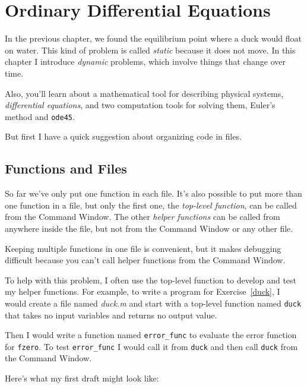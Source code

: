 \chapter{Ordinary Differential Equations}

In the previous chapter, we found the equilibrium point where a duck would float on water.  This kind of problem is called {\em static} because it does not move.  In this chapter I introduce {\em dynamic} problems, which involve things that change over time.
 
Also, you'll learn about a mathematical tool for describing physical systems, {\em differential equations}, and two computation tools for solving them, Euler's method and {\tt ode45}.

But first I have a quick suggestion about organizing code in files.

\section{Functions and Files}
\label{funfiles}

So far we've only put one function in each file.  It's also possible
to put more than one function in a file, but only the first one, the
{\em top-level function}, can be called from the Command
Window.  The other {\em helper functions} can be called from anywhere inside the file, but not from the Command Window or any other file.


Keeping multiple functions in one file is convenient, but it makes debugging
difficult because you can't call helper functions from the Command
Window.

To help with this problem, I often use the top-level function
to develop and test my helper functions.  For example, to write
a program for Exercise~\ref{duck}, I would create a file named
{\em duck.m} and start with a top-level function named {\tt duck}
that takes no input variables and returns no output value.

Then I would write a function named \verb"error_func" to
evaluate the error function for {\tt fzero}.  To test
\verb"error_func" I would call it from {\tt duck} and then
call {\tt duck} from the Command Window.


Here's what my first draft might look like:


